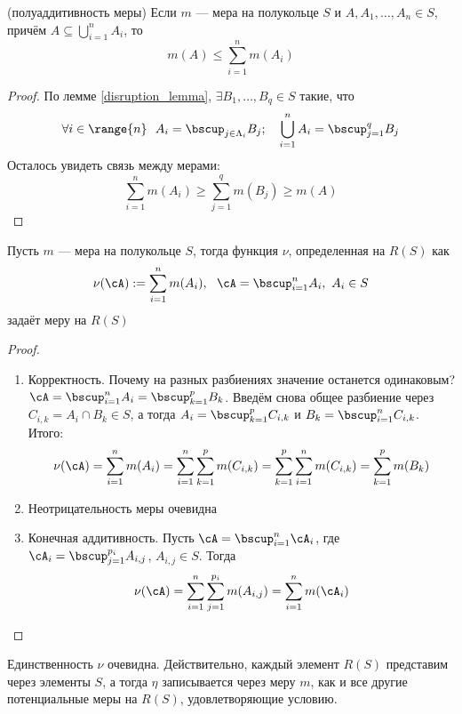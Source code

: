 \begin{lemma} (полуаддитивность меры)
	Если $m$ --- мера на полукольце $S$ и $A, A_1, \ldots, A_n \in S$, причём $A \subseteq \bigcup_{i = 1}^n A_i$, то
	\[
		m(A) \le \sum_{i = 1}^n m(A_i)
	\]
\end{lemma}

\begin{proof}
	По лемме \ref{disruption_lemma}, $\exists B_1, \ldots, B_q \in S$ такие, что
	\[
		\forall i \in \range{n}\ \ A_i = \bscup_{j \in \Lambda_i} B_j; \quad \bigcup_{i = 1}^n A_i = \bscup_{j = 1}^q B_j
	\]
	Осталось увидеть связь между мерами:
	\[
		\sum_{i = 1}^n m(A_i) \ge \sum_{j = 1}^q m(B_j) \ge m(A)
	\]
\end{proof}

\begin{theorem}
	Пусть $m$ --- мера на полукольце $S$, тогда функция $\nu$, определенная на $R(S)$ как
	\[
		\nu(\cA) := \sum_{i = 1}^n m(A_i),\ \ \cA= \bscup_{i = 1}^n A_i,\ A_i \in S
	\]
	задаёт меру на $R(S)$
\end{theorem}

\begin{proof}~
	\begin{enumerate}
		\item Корректность. Почему на разных разбиениях значение останется одинаковым? $\cA = \bscup_{i = 1}^n A_i = \bscup_{k = 1}^p B_k$. Введём снова общее разбиение через $C_{i, k} = A_i \cap B_k \in S$, а тогда $A_i = \bscup_{k = 1}^p C_{i, k}$ и $B_k = \bscup_{i = 1}^n C_{i, k}$. Итого:
		\[
			\nu(\cA) = \sum_{i = 1}^n m(A_i) = \sum_{i = 1}^n \sum_{k = 1}^p m(C_{i, k}) = \sum_{k = 1}^p \sum_{i = 1}^n m(C_{i, k}) = \sum_{k = 1}^p m(B_k)
		\]
		
		\item Неотрицательность меры очевидна
		
		\item Конечная аддитивность. Пусть $\cA = \bscup_{i = 1}^n \cA_i$, где $\cA_i = \bscup_{j = 1}^{p_i} A_{i, j}$, $A_{i, j} \in S$. Тогда
		\[
			\nu(\cA) = \sum_{i = 1}^n \sum_{j = 1}^{p_i} m(A_{i, j}) = \sum_{i = 1}^n m(\cA_i)
		\]
	\end{enumerate}
\end{proof}

\begin{note}
	Единственность $\nu$ очевидна. Действительно, каждый элемент $R(S)$ представим через элементы $S$, а тогда $\eta$ записывается через меру $m$, как и все другие потенциальные меры на $R(S)$, удовлетворяющие условию.
\end{note}

